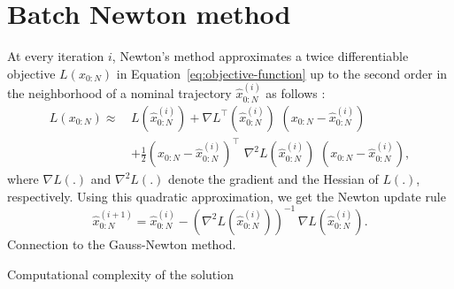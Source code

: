 \documentclass[dissertation,math,vertlayout,pdfa,colorlinks,nologo]{aaltoseries}
\begin{document}
\section{Batch Newton method} \label{sec:batch-newton}
At every iteration $i$, Newton's method approximates a twice differentiable objective $L(x_{0:N})$ in Equation~\eqref{eq:objective-function} up to the second order in the neighborhood of a nominal trajectory $\hat{x}^{(i)}_{0:N}$ as follows \citep{wright1999numerical}:
\begin{equation} \label{eq:quadratic-approximation} 
\begin{split}
    L(x_{0:N}) \approx \,
    & L(\hat{x}^{(i)}_{0:N}) + \nabla L^\top(\hat{x}^{(i)}_{0:N}) \, \,(x_{0:N} - \hat{x}^{(i)}_{0:N})  \\
    &+ \frac{1}{2}(x_{0:N} - \hat{x}^{(i)}_{0:N})^\top \, \,  \nabla^{2}L(\hat{x}^{(i)}_{0:N}) \, \, (x_{0:N} - \hat{x}^{(i)}_{0:N}),
    \end{split}
\end{equation}
where $\nabla L(.)$ and $\nabla^{2}L(.)$ denote the gradient and the Hessian of $L(.)$, respectively. Using this quadratic approximation, we get the Newton update rule \citep{wright1999numerical}
\begin{equation} \label{eq:Newton-update}
    \hat{x}^{(i+1)}_{0:N} = \hat{x}^{(i)}_{0:N} - (\nabla^{2}L(\hat{x}^{(i)}_{0:N}))^{-1} \, \nabla L(\hat{x}^{(i)}_{0:N}).
\end{equation}
Connection to the Gauss-Newton method. 

Computational complexity of the solution
\end{document}
